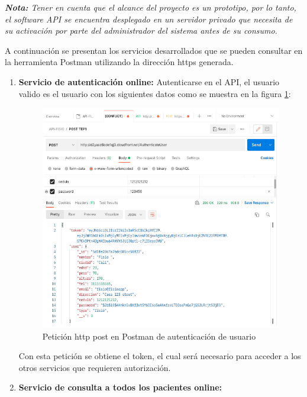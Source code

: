 \documentclass[12pt]{article}
\begin{document}
\textit{ \textbf{Nota:} Tener en cuenta que el alcance del proyecto es un prototipo, por lo tanto, el software API se encuentra desplegado en un servidor privado que necesita de su activación por parte del administrador del sistema antes de su consumo.}

A continuación se presentan los servicios desarrollados que se pueden consultar en la herramienta Postman utilizando la dirección https generada.


\begin{enumerate}
    \item \textbf{Servicio de autenticación online:} Autenticarse en el API, el usuario valido es el usuario con los siguientes datos como se muestra en la figura \ref{26}:

            \begin{figure}[ht]
            \centering
            \includegraphics[scale=0.3]{imag/authuseronline2.png}
            \caption{Petición http post en Postman de autenticación de usuario }
            \label{26}
            \end{figure}
            \FloatBarrier
    Con esta petición se obtiene el token, el cual será necesario para acceder a los otros servicios que requieren autorización.
            
\newpage
            
    \item \textbf{Servicio de consulta a todos los pacientes online:} 
    

\end{enumerate}
\end{document}
